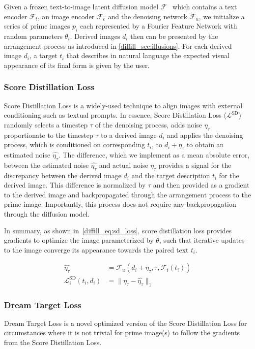 Given a frozen text-to-image latent diffusion model $\mathcal{F}$~\cite{rombach2022high} which contains a text encoder $\mathcal{F}_t$, an image encoder $\mathcal{F}_e$ and the denoising network $\mathcal{F}_u$,
we initialize a series of prime images $p_i$ each represented by a Fourier Feature Network with random parameters $\theta_i$.
Derived images $d_i$ then can be presented by the arrangement process as introduced in \cref{diffill_sec:illusions}.
For each derived image $d_i$, a target $t_i$ that describes in natural language the expected visual appearance of its final form is given by the user.

\subsubsection{Score Distillation Loss}
Score Distillation Loss is a widely-used technique to align images with external conditioning such as textual prompts.
In essence, Score Distillation Loss ($\mathcal{L}^{\text{SD}}$) randomly selects a timestep $\tau$ of the denoising process, adds noise $\eta_\tau$ proportionate to the timestep $\tau$ to a derived image $d_i$ and applies the denoising process, which is conditioned on corresponding $t_i$, to $d_i + \eta_\tau$ to obtain an estimated noise $\hat{\eta_\tau}$.
The difference, which we implement as a mean absolute error, between the estimated noise $\hat{\eta_\tau}$ and actual noise $\eta_\tau$ provides a signal for the discrepancy between the derived image $d_i$ and the target description $t_i$ for the derived image.
This difference is normalized by $\tau$ and then provided as a gradient to the derived image and backpropagated through the arrangement process to the prime image.
Importantly, this process does not require any backpropagation through the diffusion model.

In summary, as shown in~\cref{diffill_eq:sd_loss}, score distillation loss provides gradients to optimize the image parameterized by $\theta$, such that iterative updates to the image converge its appearance towards the paired text $t_i$.

\begin{align}
    \hat{\eta_\tau} &= \mathcal{F}_u(d_i + \eta_\tau, \tau, \mathcal{F}_t(t_i)) \\
    \mathcal{L}_i^{\text{SD}}(t_i, d_i)&=\| \eta_\tau - \hat{\eta_\tau} \|_1
    \label{diffill_eq:sd_loss}
\end{align}

\subsubsection{Dream Target Loss}
Dream Target Loss is a novel optimized version of the Score Distillation Loss for circumstances where it is not trivial for prime image(s) to follow the gradients from the Score Distillation Loss.

